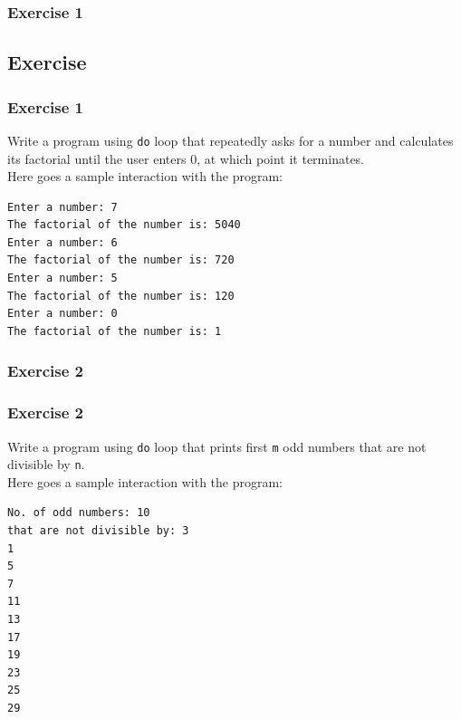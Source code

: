 \documentclass{beamer}
\begin{document}
\begin{frame} [fragile]
    \frametitle{Exercise 1}
    \subsection{Exercise} %
    \label{subsec:do_exercise}
    \subsubsection{Exercise 1} %
    \label{ssub:exercise_1}
    Write a program using \texttt{do} loop that repeatedly asks for a number and calculates its factorial until the user enters 0, at which point it terminates. \\ [0.2 in]
    Here goes a sample interaction with the program: \\
    \lstset{style=mystyle}
\begin{lstlisting}
Enter a number: 7
The factorial of the number is: 5040
Enter a number: 6
The factorial of the number is: 720
Enter a number: 5
The factorial of the number is: 120
Enter a number: 0
The factorial of the number is: 1
\end{lstlisting}
\end{frame}

\begin{frame} [fragile]
    \frametitle{Exercise 2}
    \subsubsection{Exercise 2} %
    \label{ssub:exercise_2}
    Write a program using \texttt{do} loop that prints first \texttt{m} odd numbers that are not divisible by \texttt{n}. \\ [0.2 in]
    Here goes a sample interaction with the program: \\
    \lstset{style=mystyle}
\begin{lstlisting}
No. of odd numbers: 10
that are not divisible by: 3
1
5
7
11
13
17
19
23
25
29
\end{lstlisting}
\end{frame}
\end{document}
